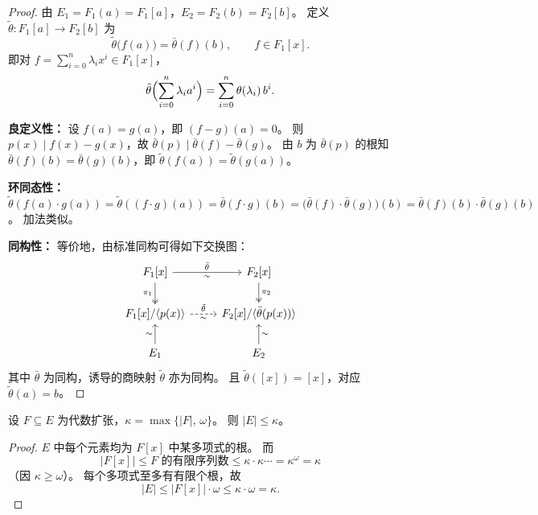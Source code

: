 \documentclass[lang=cn,a4paper,newtx]{elegantbook}
\begin{document}
\begin{proof}
  由 $E_1=F_1(a)=F_1[a]$，$E_2=F_2(b)=F_2[b]$。
  定义 $\tilde\theta\colon F_1[a]\to F_2[b]$ 为
  \[
    \tilde\theta\bigl(f(a)\bigr)=\bar\theta(f)(b),\qquad f\in F_1[x].
  \]
  即对 $f=\sum_{i=0}^{n}\lambda_i x^i\in F_1[x]$，
  \[
    \tilde\theta\Bigl(\sum_{i=0}^{n}\lambda_i a^i\Bigr)=\sum_{i=0}^{n}\theta(\lambda_i)\,b^i.
  \]

  \textbf{良定义性：}
  设 $f(a)=g(a)$，即 $(f-g)(a)=0$。
  则 $p(x)\mid f(x)-g(x)$，故 $\bar\theta(p)\mid\bar\theta(f)-\bar\theta(g)$。
  由 $b$ 为 $\bar\theta(p)$ 的根知 $\bar\theta(f)(b)=\bar\theta(g)(b)$，即 $\tilde\theta(f(a))=\tilde\theta(g(a))$。

  \textbf{环同态性：}
  $\tilde\theta(f(a)\cdot g(a))=\tilde\theta((f\cdot g)(a))=\bar\theta(f\cdot g)(b)=\bigl(\bar\theta(f)\cdot\bar\theta(g)\bigr)(b)=\bar\theta(f)(b)\cdot\bar\theta(g)(b)$。
  加法类似。

  \textbf{同构性：}
  等价地，由标准同构可得如下交换图：
  \[
    \begin{tikzcd}
      F_1[x] \arrow[r,"\bar\theta","\sim"'] \arrow[d,two heads,"\pi_1"'] & F_2[x] \arrow[d,two heads,"\pi_2"] \\
      F_1[x]/\langle p(x)\rangle \arrow[r,dashed,"\tilde\theta","\sim"'] & F_2[x]/\langle \bar\theta(p(x))\rangle \\
      E_1 \arrow[u,"\sim"] & E_2 \arrow[u,"\sim"']
    \end{tikzcd}
  \]
  其中 $\bar\theta$ 为同构，诱导的商映射 $\tilde\theta$ 亦为同构。
  且 $\tilde\theta([x])=[x]$，对应 $\tilde\theta(a)=b$。
\end{proof}

\begin{proposition}\label{algebraic-ext-cardinality}
  设 $F\subseteq E$ 为代数扩张，$\kappa=\max\{|F|,\,\omega\}$。
  则 $|E|\le\kappa$。
\end{proposition}

\begin{proof}
  $E$ 中每个元素均为 $F[x]$ 中某多项式的根。
  而
  \[
    |F[x]|\le\text{$F$ 的有限序列数}\le\kappa\cdot\kappa\cdots=\kappa^{\omega}=\kappa
  \]
  （因 $\kappa\ge\omega$）。
  每个多项式至多有有限个根，故
  \[
    |E|\le|F[x]|\cdot\omega\le\kappa\cdot\omega=\kappa.
  \]
\end{proof}
\end{document}
